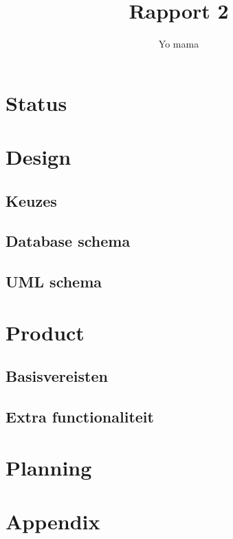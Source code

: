 \documentclass[12pt,a4paper]{article}
\begin{document}
\title{Rapport 2}
\author{Yo mama}
\maketitle

\section{Status}

\section{Design}

\subsection{Keuzes}

\subsection{Database schema}

\subsection{UML schema}

\section{Product}

\subsection{Basisvereisten}

\subsection{Extra functionaliteit}

\section{Planning}

\section{Appendix}
\end{document}
